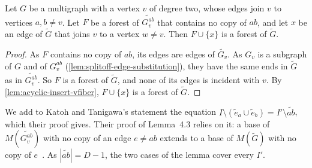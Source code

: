 \begin{lemma}
  \label{lem:reverse-pendant-insert}
  \leanok
  Let $G$ be a multigraph with a vertex $v$ of degree two, whose edges
  join $v$ to vertices $a, b \neq v$. Let $F$ be a forest of
  $\widetilde{G_v^{ab}}$ that contains no copy of $ab$, and let $x$ be an
  edge of $\tilde G$ that joins $v$ to a vertex $w \neq v$. Then
  $F \cup \{x\}$ is a forest of $\tilde G$.
\end{lemma}
\begin{proof}
  \leanok
  As $F$ contains no copy of $ab$, its edges are edges of
  $\widetilde{G_v}$. As $G_v$ is a subgraph of $G$ and of $G_v^{ab}$
  (\cref{lem:splitoff-edge-substitution}), they have the same ends in
  $\tilde G$ as in $\widetilde{G_v^{ab}}$. So $F$ is a forest of
  $\tilde G$, and none of its edges is incident with $v$. By
  \cref{lem:acyclic-insert-vfiber}, $F \cup \{x\}$ is a forest of
  $\tilde G$.
\end{proof}

We add to Katoh and Tanigawa's statement the equation
$I \setminus (\tilde e_a \cup \tilde e_b) = I' \setminus \widetilde{ab}$,
which their proof gives. Their proof of Lemma~4.3 relies on it: a
base of $M(\widetilde{G_v^{ab}})$ with no copy of an edge $e \neq ab$
extends to a base of $M(\tilde G)$ with no copy of
$e$~\cite[p.~661]{katohTanigawa2011}. As $|\widetilde{ab}| = D - 1$, the
two cases of the lemma cover every $I'$.

